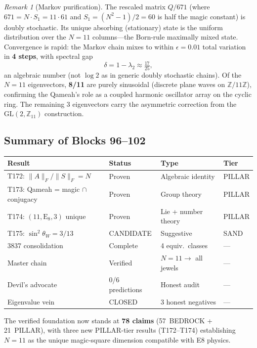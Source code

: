 \documentclass[aps,prd,twocolumn,superscriptaddress,floatfix,nofootinbib]{revtex4-2}
\theoremstyle{definition}
\theoremstyle{remark}
\newtheorem{remark}[theorem]{Remark}
\begin{document}
\begin{remark}[Markov purification]
\label{rem:markov}
The rescaled matrix $Q/671$ (where $671 = N \cdot S_1 = 11 \cdot 61$ and
$S_1 = (N^2-1)/2 = 60$ is half the magic constant) is doubly stochastic.
Its unique absorbing (stationary) state is the uniform distribution over
the $N=11$ columns---the Born-rule maximally mixed state.  Convergence
is rapid: the Markov chain mixes to within $\epsilon = 0.01$ total
variation in \textbf{4 steps}, with spectral gap
\[
\delta = 1 - \lambda_2 \approx \tfrac{17}{25},
\]
an algebraic number (not $\log 2$ as in generic doubly stochastic chains).
Of the $N=11$ eigenvectors, \textbf{8/11} are purely sinusoidal (discrete
plane waves on $\mathbb{Z}/11\mathbb{Z}$), confirming the Qameah's role
as a coupled harmonic oscillator array on the cyclic ring.  The remaining
3 eigenvectors carry the asymmetric correction from the $\mathrm{GL}(2,\mathbb{Z}_{11})$
construction.
\end{remark}

\subsection{Summary of Blocks 96--102}

\begin{center}
\begin{tabular}{llll}
\toprule
Result & Status & Type & Tier \\
\midrule
T172: $\|A\|_F/\|S\|_F = N$ & Proven & Algebraic identity & PILLAR \\
T173: Qameah = magic $\cap$ conjugacy & Proven & Group theory & PILLAR \\
T174: $(11, \mathrm{E}_8, 3)$ unique & Proven & Lie + number theory & PILLAR \\
T175: $\sin^2\theta_W = 3/13$ & CANDIDATE & Suggestive & SAND \\
3837 consolidation & Complete & 4 equiv.\ classes & --- \\
Master chain & Verified & $N{=}11 \to$ all jewels & --- \\
Devil's advocate & 0/6 predictions & Honest audit & --- \\
Eigenvalue vein & CLOSED & 3 honest negatives & --- \\
\bottomrule
\end{tabular}
\end{center}

\noindent
The verified foundation now stands at \textbf{78 claims} (57~BEDROCK +
21~PILLAR), with three new PILLAR-tier results (T172--T174) establishing
$N{=}11$ as the unique magic-square dimension compatible with E8 physics.
\end{document}
